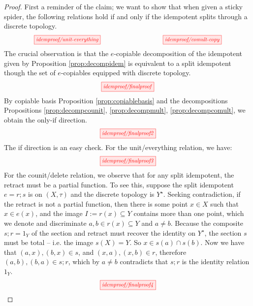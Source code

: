 \newpage
{}
\begin{proof}
First a reminder of the claim; we want to show that when given a sticky spider, the following relations hold if and only if the idempotent splits through a discrete topology.
\[\scalebox{0.8}{\tikzfig{idemproof/unit-everything}} \quad\quad\quad\quad\quad\quad\quad\quad \scalebox{0.8}{\tikzfig{idemproof/comult-copy}}\]
The crucial observation is that the $e$-copiable decomposition of the idempotent given by Proposition \ref{prop:decompidem} is equivalent to a split idempotent though the set of $e$-copiables equipped with discrete topology.
\[\scalebox{0.8}{\tikzfig{idemproof/finalproof}}\]
By copiable basis Proposition \ref{prop:copiablebasis} and the decompositions Propositions \ref{prop:decompcounit}, \ref{prop:decompmult}, \ref{prop:decompcomult}, we obtain the only-if direction.
\[\scalebox{0.8}{\tikzfig{idemproof/finalproof2}}\]
The if direction is an easy check. For the unit/everything relation, we have:
\[\scalebox{0.8}{\tikzfig{idemproof/finalproof3}}\]
For the counit/delete relation, we observe that for any split idempotent, the retract must be a partial function. To see this, suppose the split idempotent $e = r;s$ is on $(X,\tau)$ and the discrete topology is $Y^\star$. Seeking contradiction, if the retract is not a partial function, then there is some point $x \in X$ such that $x \in e(x)$, and the image $I := r(x) \subseteq Y$ contains more than one point, which we denote and discriminate $a,b \in r(x) \subseteq Y$ and $a \neq b$. Because the composite $s;r = 1_Y$ of the section and retract must recover the identity on $Y^\star$, the section $s$ must be total -- i.e. the image $s(X) = Y$. So $x \in s(a) \cap s(b)$. Now we have that $(a,x),(b,x) \in s$, and $(x,a),(x,b) \in r$, therefore $(a,b),(b,a) \in s;r$, which by $a \neq b$ contradicts that $s;r$ is the identity relation $1_Y$.
\[\scalebox{0.8}{\tikzfig{idemproof/finalproof4}}\]
\end{proof}